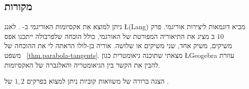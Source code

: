 \subsection*{מקורות}

ניתן למוצא את אקסיומות האוריגמי ב-%
\cite{wiki:hh-axioms}.
לאנג
\L{(Lang)}
\cite{lang}
מביא דוגמאות ליצירות אוריגמי. פרק%
~$10$
ב
\cite{martin}
מציג את התיאוריה המפורטת של האורגמי, כולל הוכחה שלפרבולה ייתכנו אפס משיקים, משיק אחד, שני משיקים או שלושה. אוריה בן-לולו הראתה לי את ההוכחה של משפט%
~\ref{thm.parabola-tangents}.
מצאתי שתוכנה גיאומטרית כגון 
\L{Geogebra}
עוזרת להבין את הקשר בין הגיאומטריה והאלגברה של האקסיומות.

הצגה ברורה של משוואות קוביות ניתן למצוא בפרקים
$1,2$
של
\cite{jorg}.
